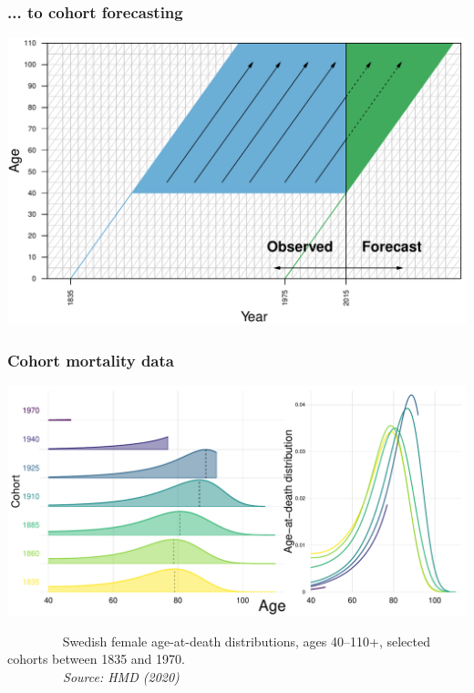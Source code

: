 \documentclass[12pt, xcolor=table]{beamer}  %
\begin{document}
\begin{frame}\frametitle{... to cohort forecasting}
	
	\vspace{0.4cm}
	\begin{center}
		\includegraphics[scale=0.56]{Figures/Ch4/F1_COH}
	\end{center}
	
\end{frame}


\begin{frame}\frametitle{Cohort mortality data}
	
	\vspace{0.1cm}
	\begin{center}
		\includegraphics[scale=0.47]{Figures/Ch4/F2_COHdata}
	\end{center}
\tiny{$\quad\quad\quad\quad$ Swedish female age-at-death distributions, ages 40--110+, selected cohorts between 1835 and 1970. \\ \emph{$\quad\quad\quad\quad$ Source: HMD (2020)}}	
\end{frame}
\end{document}
